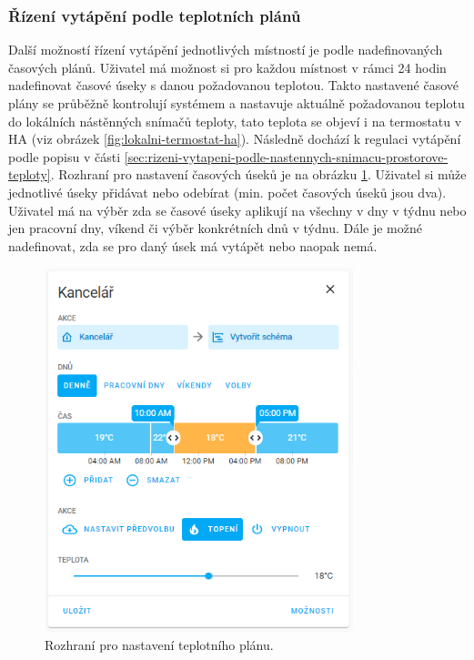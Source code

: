 \subsubsection{Řízení vytápění podle teplotních plánů} 
\label{sec:rizeni-vytapeni-podle-teplotnich-planu}
Další možností řízení vytápění jednotlivých místností je podle nadefinovaných časových plánů. Uživatel má možnost si pro každou místnost v rámci 24 hodin nadefinovat časové úseky s danou požadovanou teplotou. Takto nastavené časové plány se průběžně kontrolují systémem a nastavuje aktuálně požadovanou teplotu do lokálních nástěnných snímačů teploty, tato teplota se objeví i na termostatu v HA (viz obrázek \ref{fig:lokalni-termostat-ha}). Následně dochází k regulaci vytápění podle popisu v části \ref{sec:rizeni-vytapeni-podle-nastennych-snimacu-prostorove-teploty}. Rozhraní pro nastavení časových úseků je na obrázku \ref{fig:teplotni-plan-ha}. Uživatel si může jednotlivé úseky přidávat nebo odebírat (min. počet časových úseků jsou dva). Uživatel má na výběr zda se časové úseky aplikují na všechny v dny v týdnu nebo jen pracovní dny, víkend či výběr konkrétních dnů v týdnu. Dále je možné nadefinovat, zda se pro daný úsek má vytápět nebo naopak nemá.

\begin{figure}[H]
    \centering
    \includegraphics[width=0.8\textwidth]{images/software-ha/teplotni-plan-ha.png}
    \caption{Rozhraní pro nastavení teplotního plánu.}
    \label{fig:teplotni-plan-ha}
\end{figure}

